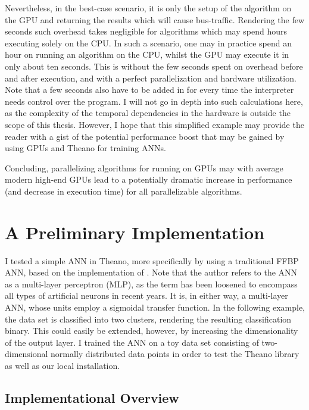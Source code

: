 Nevertheless, in the best-case scenario, it is only the setup of the algorithm on the GPU and returning the results which will cause bus-traffic. Rendering the few seconds such overhead takes negligible for algorithms which may spend hours executing solely on the CPU. In such a scenario, one may in practice spend an hour on running an algorithm on the CPU, whilst the GPU may execute it in only about ten seconds. This is without the few seconds spent on overhead before and after execution, and with a perfect parallelization and hardware utilization. Note that a few seconds also have to be added in for every time the interpreter needs control over the program. I will not go in depth into such calculations here, as the complexity of the temporal dependencies in the hardware is outside the scope of this thesis. However, I hope that this simplified example may provide the reader with a gist of the potential performance boost that may be gained by using GPUs and Theano for training ANNs.

Concluding, parallelizing algorithms for running on GPUs may with average modern high-end GPUs lead to a potentially dramatic increase in performance (and decrease in execution time) for all parallelizable algorithms.

\section{A Preliminary Implementation}\label{preliminary_example}

I tested a simple ANN in Theano, more specifically by using a traditional FFBP ANN, based on the implementation of \citep{Raffel2015}. Note that the author refers to the ANN as a multi-layer perceptron (MLP), as the term has been loosened to encompass all types of artificial neurons in recent years. It is, in either way, a multi-layer ANN, whose units employ a sigmoidal transfer function. In the following example, the data set is classified into two clusters, rendering the resulting classification binary. This could easily be extended, however, by increasing the dimensionality of the output layer. I trained the ANN on a toy data set consisting of two-dimensional normally distributed data points in order to test the Theano library as well as our local installation.


\subsection{Implementational Overview}

